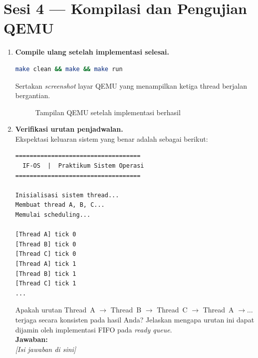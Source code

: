 \section{Sesi 4 --- Kompilasi dan Pengujian QEMU}

\begin{enumerate}

    \item \textbf{Compile ulang setelah implementasi selesai.}

    \begin{lstlisting}[language=bash, caption={Perintah build dan run setelah implementasi}]
make clean && make && make run
    \end{lstlisting}

    Sertakan \textit{screenshot} layar QEMU yang menampilkan ketiga
    thread berjalan bergantian.

    \begin{figure}[H]
        \centering
        \caption{Tampilan QEMU setelah implementasi berhasil}
    \end{figure}

    \item \textbf{Verifikasi urutan penjadwalan.}\\
    Ekspektasi keluaran sistem yang benar adalah sebagai berikut:

    \begin{lstlisting}[caption={Ekspektasi output Round-Robin di layar QEMU}]
===================================
  IF-OS  |  Praktikum Sistem Operasi
===================================

Inisialisasi sistem thread...
Membuat thread A, B, C...
Memulai scheduling...

[Thread A] tick 0
[Thread B] tick 0
[Thread C] tick 0
[Thread A] tick 1
[Thread B] tick 1
[Thread C] tick 1
...
    \end{lstlisting}

    Apakah urutan Thread~A $\to$ Thread~B $\to$ Thread~C $\to$
    Thread~A $\to \ldots$ terjaga secara konsisten pada hasil Anda?
    Jelaskan mengapa urutan ini dapat dijamin oleh implementasi FIFO
    pada \textit{ready queue}.\\[0.3cm]
    \textbf{Jawaban:}\\
    \textit{[Isi jawaban di sini]}


\end{enumerate}
